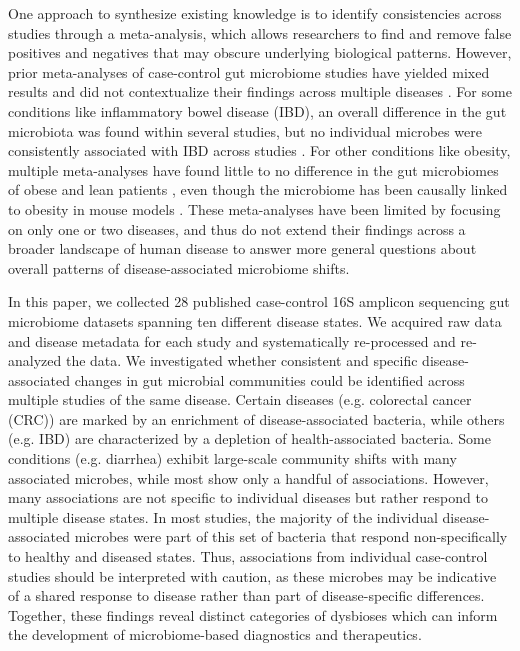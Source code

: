 \documentclass{article}
\begin{document}
One approach to synthesize existing knowledge is to identify consistencies across studies through a meta-analysis, which allows researchers to find and remove false positives and negatives that may obscure underlying biological patterns. 
However, prior meta-analyses of case-control gut microbiome studies have yielded mixed results and did not contextualize their findings across multiple diseases \cite{walters2014meta, Sze07092016,finucane2014obesity}. 
For some conditions like inflammatory bowel disease (IBD), an overall difference in the gut microbiota was found within several studies, but no individual microbes were consistently associated with IBD across studies \cite{walters2014meta}. 
For other conditions like obesity, multiple meta-analyses have found little to no difference in the gut microbiomes of obese and lean patients \cite{walters2014meta,Sze07092016,finucane2014obesity}, even though the microbiome has been causally linked to obesity in mouse models \cite{turnbaugh2006obesity, ridaura2013gut}. 
These meta-analyses have been limited by focusing on only one or two diseases, and thus do not extend their findings across a broader landscape of human disease to answer more general questions about overall patterns of disease-associated microbiome shifts.

In this paper, we collected 28 published case-control 16S amplicon sequencing gut microbiome datasets spanning ten different disease states. 
We acquired raw data and disease metadata for each study and systematically re-processed and re-analyzed the data. 
We investigated whether consistent and specific disease-associated changes in gut microbial communities could be identified across multiple studies of the same disease. 
Certain diseases (e.g. colorectal cancer (CRC)) are marked by an enrichment of disease-associated bacteria, while others (e.g. IBD) are characterized by a depletion of health-associated bacteria.
Some conditions (e.g. diarrhea) exhibit large-scale community shifts with many associated microbes, while most show only a handful of associations. 
However, many associations are not specific to individual diseases but rather respond to multiple disease states. 
In most studies, the majority of the individual disease-associated microbes were part of this set of bacteria that respond non-specifically to healthy and diseased states. 
Thus, associations from individual case-control studies should be interpreted with caution, as these microbes may be indicative of a shared response to disease rather than part of disease-specific differences.
Together, these findings reveal distinct categories of dysbioses which can inform the development of microbiome-based diagnostics and therapeutics.
\end{document}
